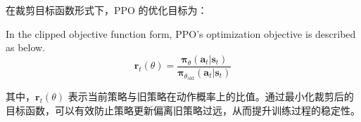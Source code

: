 
在裁剪目标函数形式下，PPO 的优化目标为：

In the clipped objective function form, PPO's optimization objective is described as below.
\begin{equation}
	\boldsymbol{r}_t(\theta) = \frac{\boldsymbol{\pi}_\theta(\boldsymbol{a}_t | \boldsymbol{s}_t)}{\boldsymbol{\pi}_{\theta_{\text{old}}}(\boldsymbol{a}_t | \boldsymbol{s}_t)}
\end{equation}

其中，\( \boldsymbol{r}_t(\theta) \) 表示当前策略与旧策略在动作概率上的比值。通过最小化裁剪后的目标函数，可以有效防止策略更新偏离旧策略过远，从而提升训练过程的稳定性。




